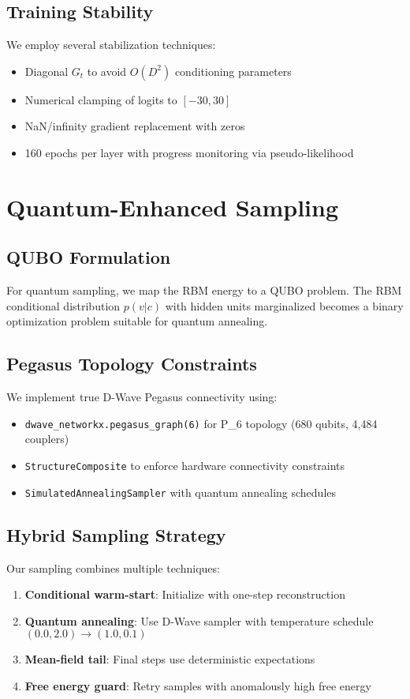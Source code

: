 \documentclass[11pt]{article}
\begin{document}
\subsection{Training Stability}
We employ several stabilization techniques:
\begin{itemize}
    \item Diagonal $G_t$ to avoid $O(D^2)$ conditioning parameters
    \item Numerical clamping of logits to $[-30, 30]$ 
    \item NaN/infinity gradient replacement with zeros
    \item 160 epochs per layer with progress monitoring via pseudo-likelihood
\end{itemize}

\section{Quantum-Enhanced Sampling}

\subsection{QUBO Formulation}
For quantum sampling, we map the RBM energy to a QUBO problem. The RBM conditional distribution $p(v|c)$ with hidden units marginalized becomes a binary optimization problem suitable for quantum annealing.

\subsection{Pegasus Topology Constraints}
We implement true D-Wave Pegasus connectivity using:
\begin{itemize}
    \item \texttt{dwave\_networkx.pegasus\_graph(6)} for P_6 topology (680 qubits, 4,484 couplers)
    \item \texttt{StructureComposite} to enforce hardware connectivity constraints
    \item \texttt{SimulatedAnnealingSampler} with quantum annealing schedules
\end{itemize}

\subsection{Hybrid Sampling Strategy}
Our sampling combines multiple techniques:
\begin{enumerate}
    \item \textbf{Conditional warm-start}: Initialize with one-step reconstruction
    \item \textbf{Quantum annealing}: Use D-Wave sampler with temperature schedule $(0.0, 2.0) \to (1.0, 0.1)$
    \item \textbf{Mean-field tail}: Final steps use deterministic expectations
    \item \textbf{Free energy guard}: Retry samples with anomalously high free energy
\end{enumerate}
\end{document}
